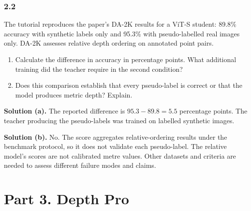 \documentclass[11pt,a4paper]{article}
\begin{document}
\begin{minipage}{\linewidth}
\subsubsection*{2.2}
The tutorial reproduces the paper's DA-2K results for a ViT-S student: 89.8\% accuracy with synthetic labels only and 95.3\% with pseudo-labelled real images only.
DA-2K assesses relative depth ordering on annotated point pairs.
\begin{enumerate}[label=(\alph*),nosep]
\item Calculate the difference in accuracy in percentage points.
What additional training did the teacher require in the second condition?
\item Does this comparison establish that every pseudo-label is correct or that the model produces metric depth?
Explain.
\end{enumerate}
\ifsolutions
\noindent\textbf{Solution (a).}
The reported difference is $95.3-89.8=5.5$ percentage points.
The teacher producing the pseudo-labels was trained on labelled synthetic images.

\noindent\textbf{Solution (b).}
No.
The score aggregates relative-ordering results under the benchmark protocol, so it does not validate each pseudo-label.
The relative model's scores are not calibrated metre values.
Other datasets and criteria are needed to assess different failure modes and claims.
\fi
\end{minipage}
\par\medskip
{}
\section*{Part 3. Depth Pro}
\end{document}
